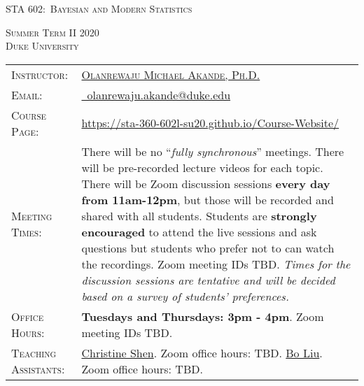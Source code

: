 \documentclass[11pt, a4paper]{article}
\begin{document}
\renewcommand{\arraystretch}{1.5}	


\begin{center}
{\Large \textsc{STA 602:\ Bayesian and Modern Statistics}}
\end{center}


\begin{center}
	\textsc{Summer Term II 2020} \\
	\textsc{Duke University} \\
\end{center}




\begin{center}
	\begin{minipage}[t]{.9\textwidth}
		\begin{tabular}{@{}L{3cm}L{12cm}}
			\toprule[0.065cm]
			\textsc{Instructor:} & \href{https://akandelanre.github.io.}{\textsc{Olanrewaju Michael Akande, Ph.D.}} \\
			\textsc{Email:} &\href{mailto:olanrewaju.akande@duke.edu}{\Envelope ~olanrewaju.akande@duke.edu} \\
			\textsc{Course Page:} & \href{https://sta-360-602l-su20.github.io/Course-Website/}{https://sta-360-602l-su20.github.io/Course-Website/} \\
			\textsc{Meeting Times:} & There will be no ``\textit{fully synchronous}'' meetings. There will be pre-recorded lecture videos for each topic. There will be Zoom discussion sessions \textbf{every day from 11am-12pm}, but those will be recorded and shared with all students. Students are \textbf{strongly encouraged} to attend the live sessions and ask questions but students who prefer not to can watch the recordings. Zoom meeting IDs TBD. 
			\newline \textit{Times for the discussion sessions are tentative and will be decided based on a survey of students' preferences.} \\
			\textsc{Office Hours:} & \textbf{Tuesdays and Thursdays: 3pm - 4pm}. Zoom meeting IDs TBD. \\
			\textsc{Teaching Assistants:} & \href{https://stat.duke.edu/people/christine-shen}{Christine Shen}. Zoom office hours: TBD.
			\newline \href{https://stat.duke.edu/people/bo-liu-0}{Bo Liu}. Zoom office hours: TBD.

\end{tabular}
\end{minipage}
\end{center}
\end{document}
